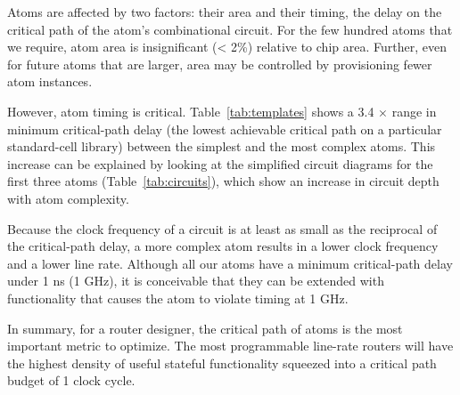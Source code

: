  Atoms are affected by
two factors: their area and their timing, \ie the delay on the critical path of
the atom's combinational circuit. For the few hundred atoms that we require,
atom area is insignificant (< 2\%) relative to chip area.  Further, even for
future atoms that are larger, area may be controlled by provisioning fewer atom
instances.

However, atom timing is critical. Table~\ref{tab:templates} shows a 3.4
$\times$ range in minimum critical-path delay (\ie the lowest achievable
critical path on a particular standard-cell library) between the simplest and
the most complex atoms.  This increase can be explained by looking at the
simplified circuit diagrams for the first three atoms
(Table~\ref{tab:circuits}), which show an increase in circuit depth with atom
complexity.

Because the clock frequency of a circuit is at least as small as the reciprocal
of the critical-path delay, a more complex atom results in a lower clock
frequency and a lower line rate. Although all our atoms have a minimum
critical-path delay under 1 ns (1 GHz), it is conceivable that they can be
extended with functionality that causes the atom to violate timing at 1 GHz.

In summary, for a router designer, the critical path of atoms is the most
important metric to optimize. The most programmable line-rate routers will have
the highest density of useful stateful functionality squeezed into a critical
path budget of 1 clock cycle.

